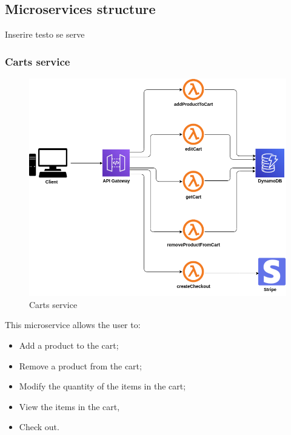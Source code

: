 \subsection{Microservices structure}
Inserire testo se serve
\subsubsection{Carts service}
\begin{figure}[!h]
    \vspace{5px}
    \includegraphics[scale=0.5]{../../../../Images/Diagrammi/maintainerManual/cartService.png}
    \centering
    \caption{Carts service}
\end{figure}
This microservice allows the user to:
\begin{itemize}
    \item Add a product to the cart;
    \item Remove a product from the cart;
    \item Modify the quantity of the items in the cart;
    \item View the items in the cart,
    \item Check out.
\end{itemize}
\pagebreak
